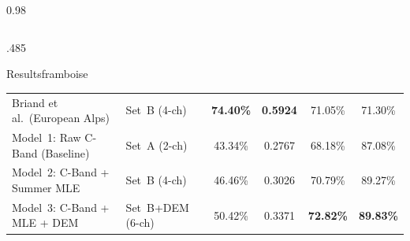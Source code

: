 \documentclass[final,svgnames,english]{beamer}
\begin{document}
\begin{frame}[fragile]{}
\begin{columns}[T]
\begin{column}{0.98\linewidth}
\begin{columns}[T]
\begin{column}{.485\linewidth}
\begin{plainblock}{}
\begin{findingblock}{Results}{framboise}
\begin{table}[!htbp]
{\begin{tabular}{llcccc}
                Briand et al.\ (European Alps) & Set~B (4-ch) & \textbf{74.40\%} & \textbf{0.5924} & 71.05\% & 71.30\% \\
                Model~1: Raw C-Band (Baseline) & Set~A (2-ch) & 43.34\% & 0.2767 & 68.18\% & 87.08\% \\
                Model~2: C-Band + Summer MLE & Set~B (4-ch) & 46.46\% & 0.3026 & 70.79\% & 89.27\% \\
                Model~3: C-Band + MLE + DEM & Set~B+DEM (6-ch) & 50.42\% & 0.3371 & \textbf{72.82\%} & \textbf{89.83\%} \\
                \bottomrule
              \end{tabular}%
              }
            \end{table}
            \vspace{10pt}

            \begin{table}[!htbp]
              \caption{Elevation-wise metrics on the unseen test basin}
              \label{tab:elevation_results}
              \vspace{-1.4em}
              \centering
              \renewcommand{\arraystretch}{0.92}
            \end{table}
            \vspace{12pt}
            \end{findingblock}


\end{plainblock}
\end{column}
\end{columns}
\end{column}
\end{columns}
\end{frame}
\end{document}
